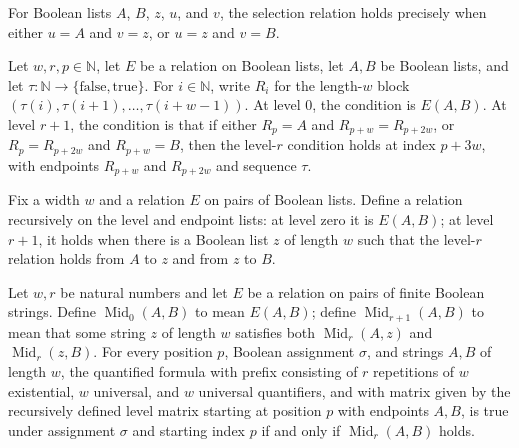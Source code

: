 \begin{definition}
\label{Complexity.TQBFHard.Sel}
\leanok
For Boolean lists $A$, $B$, $z$, $u$, and $v$, the selection relation holds precisely
when either $u=A$ and $v=z$, or $u=z$ and $v=B$.
\end{definition}

\begin{definition}
\label{Complexity.TQBFHard.levelMatrix}
\leanok
{}
Let $w,r,p\in\mathbb{N}$, let $E$ be a relation on Boolean lists, let $A,B$ be Boolean
lists, and let $\tau:\mathbb{N}\to\{\mathrm{false},\mathrm{true}\}$. For
$i\in\mathbb{N}$, write $R_i$ for the length-$w$ block
$(\tau(i),\tau(i+1),\ldots,\tau(i+w-1))$. At level $0$, the condition is $E(A,B)$. At
level $r+1$, the condition is that if either $R_p=A$ and $R_{p+w}=R_{p+2w}$, or
$R_p=R_{p+2w}$ and $R_{p+w}=B$, then the level-$r$ condition holds at index $p+3w$, with
endpoints $R_{p+w}$ and $R_{p+2w}$ and sequence $\tau$.
\end{definition}

\begin{definition}
\label{Complexity.TQBFHard.Mid}
\leanok
Fix a width $w$ and a relation $E$ on pairs of Boolean lists. Define a relation
recursively on the level and endpoint lists: at level zero it is $E(A,B)$; at level
$r+1$, it holds when there is a Boolean list $z$ of length $w$ such that the level-$r$
relation holds from $A$ to $z$ and from $z$ to $B$.
\end{definition}

\begin{theorem}
\label{Complexity.TQBFHard.prefixTruth_levelMatrix}
\leanok
{}
Let $w,r$ be natural numbers and let $E$ be a relation on pairs of finite Boolean
strings. Define $\operatorname{Mid}_0(A,B)$ to mean $E(A,B)$; define
$\operatorname{Mid}_{r+1}(A,B)$ to mean that some string $z$ of length $w$ satisfies
both $\operatorname{Mid}_r(A,z)$ and $\operatorname{Mid}_r(z,B)$. For every position
$p$, Boolean assignment $\sigma$, and strings $A,B$ of length $w$, the quantified
formula with prefix consisting of $r$ repetitions of $w$ existential, $w$ universal, and
$w$ universal quantifiers, and with matrix given by the recursively defined level matrix
starting at position $p$ with endpoints $A,B$, is true under assignment $\sigma$ and
starting index $p$ if and only if $\operatorname{Mid}_r(A,B)$ holds.
\end{theorem}

